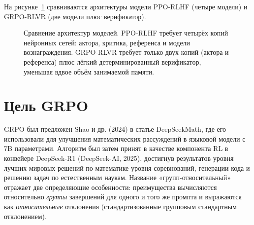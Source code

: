 На рисунке~\ref{fig:grpo-architecture} сравниваются архитектуры модели PPO-RLHF (четыре модели) и GRPO-RLVR (две модели плюс верификатор).

\begin{figure}[ht]
\centering
{}
\caption{Сравнение архитектур моделей. PPO-RLHF требует четырёх копий нейронных сетей: актора, критика, референса и модели вознаграждения. GRPO-RLVR требует только двух копий (актора и референса) плюс лёгкий детерминированный верификатор, уменьшая вдвое объём занимаемой памяти.}
\label{fig:grpo-architecture}
\end{figure}

\section{Цель GRPO}
\label{sec:grpo-objective}

GRPO был предложен Shao и др. (2024) в статье DeepSeekMath, где его использовали для улучшения математических рассуждений в языковой модели с 7B параметрами. Алгоритм был затем принят в качестве компонента RL в конвейере DeepSeek-R1 (DeepSeek-AI, 2025), достигнув результатов уровня лучших мировых решений по математике уровня соревнований, генерации кода и решению задач по естественным наукам. Название «групп-относительный» отражает две определяющие особенности: преимущества вычисляются относительно \emph{группы} завершений для одного и того же промпта и выражаются как \emph{относительные} отклонения (стандартизованные групповым стандартным отклонением).

